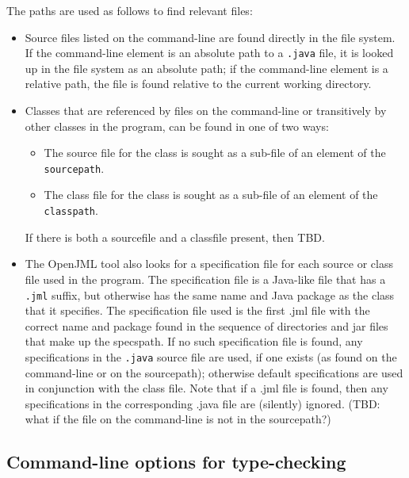 The paths are used as follows to find relevant files:
\begin{itemize}[noitemsep,nolistsep]
\item Source files listed on the command-line are found directly in the file system. 
If the command-line element is an absolute path to a \texttt{.java} file, it is looked up in the file system as an absolute path; 
if the command-line element is a relative path, the file is found relative to the current working directory.
\item Classes that are referenced by files on the command-line or transitively by other classes in the program, can be found in one of two ways:
\begin{itemize}[noitemsep,nolistsep]
\item The source file for the class is sought as a sub-file of an element of the \texttt{sourcepath}.
\item The class file for the class is sought as a sub-file of an element of the \texttt{classpath}.
\end{itemize}
If there is both a sourcefile and a classfile present, then TBD.
\item The OpenJML tool also looks for a specification file for each source or 
class file used in the program. The specification file is a Java-like file that 
has a \texttt{.jml} suffix, but otherwise has the same name and Java package 
as the class that it specifies. The specification file used is the first .jml file 
with the correct name and package found in the sequence of directories and jar 
files that make up the specspath. 
If no such specification file is found, any specifications in 
the \texttt{.java} source file are used, if one exists 
(as found on the command-line or on the sourcepath); otherwise default specifications are used in conjunction with the class file. 
Note that if a .jml file 
is found, then any specifications in the corresponding .java file are 
(silently) ignored.
(TBD: what if the file on the command-line is not in the sourcepath?)
\end{itemize}





\subsection{Command-line options for type-checking}

